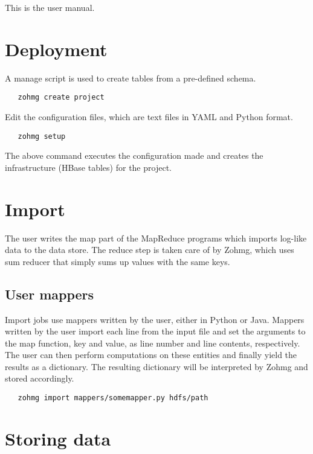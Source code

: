 \documentclass[a4paper,10pt]{book}
\begin{document}
This is the user manual.

\section{Deployment}

A manage script is used to create tables from a pre-defined schema.

\begin{verbatim}
   zohmg create project
\end{verbatim}

\noindent Edit the configuration files, which are text files in YAML and
Python format.

\begin{verbatim}
   zohmg setup
\end{verbatim}

\noindent The above command executes the configuration made and creates the
infrastructure (HBase tables) for the project.


\section{Import}

The user writes the map part of the MapReduce programs which imports
log-like data to the data store. The reduce step is taken care of by Zohmg,
which uses sum reducer that simply sums up values with the same keys.


\subsection{User mappers}

Import jobs use mappers written by the user, either in Python or Java.
Mappers written by the user import each line from the input file and set
the arguments to the map function, key and value, as line number and line
contents, respectively. The user can then perform computations on these
entities and finally yield the results as a dictionary. The resulting
dictionary will be interpreted by Zohmg and stored accordingly.

\begin{verbatim}
   zohmg import mappers/somemapper.py hdfs/path
\end{verbatim}


\section{Storing data}
\end{document}
